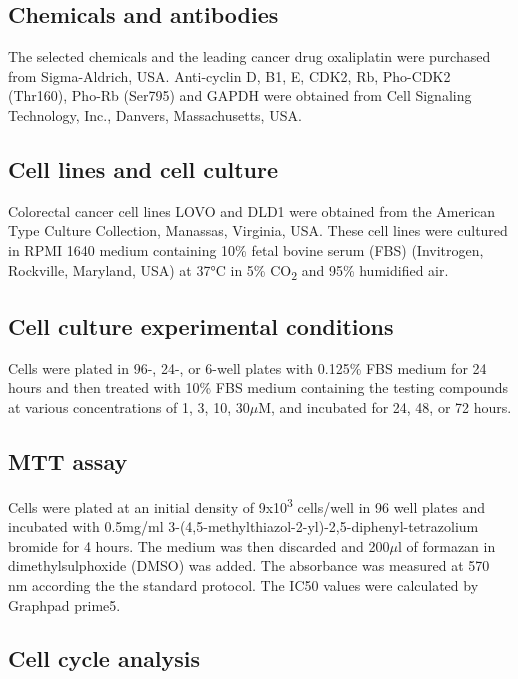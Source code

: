 \subsection{Chemicals and antibodies}

The selected chemicals and the leading cancer drug oxaliplatin were purchased from Sigma-Aldrich, USA. Anti-cyclin D, B1, E, CDK2, Rb, Pho-CDK2 (Thr160), Pho-Rb (Ser795) and GAPDH were obtained from Cell Signaling Technology, Inc., Danvers, Massachusetts, USA.

\subsection{Cell lines and cell culture}

Colorectal cancer cell lines LOVO and DLD1 were obtained from the American Type Culture Collection, Manassas, Virginia, USA. These cell lines were cultured in RPMI 1640 medium containing 10\% fetal bovine serum (FBS) (Invitrogen, Rockville, Maryland, USA) at 37°C in 5\% CO\textsubscript{2} and 95\% humidified air.

\subsection{Cell culture experimental conditions}

Cells were plated in 96-, 24-, or 6-well plates with 0.125\% FBS medium for 24 hours and then treated with 10\% FBS medium containing the testing compounds at various concentrations of 1, 3, 10, 30$\mu$M, and incubated for 24, 48, or 72 hours.

\subsection{MTT assay}

Cells were plated at an initial density of 9x10\textsuperscript{3} cells/well in 96 well plates and incubated with 0.5mg/ml 3-(4,5-methylthiazol-2-yl)-2,5-diphenyl-tetrazolium bromide for 4 hours. The medium was then discarded and 200$\mu$l of formazan in dimethylsulphoxide (DMSO) was added. The absorbance was measured at 570 nm according the the standard protocol. The IC50 values were calculated by Graphpad prime5.

\subsection{Cell cycle analysis}

